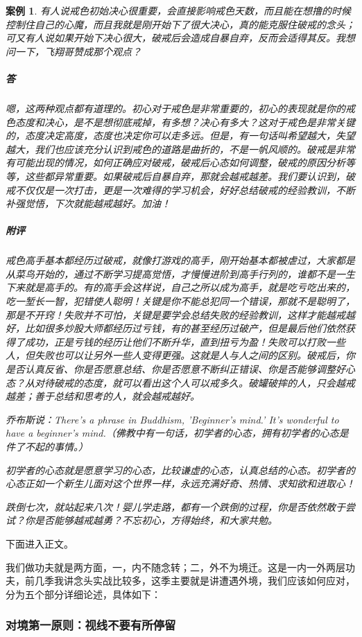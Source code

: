 \documentclass{ctexart}
\newtheorem{case}{案例}
\begin{document}
\begin{case}
    有人说戒色初始决心很重要，会直接影响戒色天数，而且能在想撸的时候控制住自己的心魔，而且我就是刚开始下了很大决心，真的能克服住破戒的念头；可又有人说如果开始下决心很大，破戒后会造成自暴自弃，反而会适得其反。我想问一下，飞翔哥赞成那个观点？
    \subparagraph{答} 嗯，这两种观点都有道理的。初心对于戒色是非常重要的，初心的表现就是你的戒色态度和决心，是不是想彻底戒掉，有多想？决心有多大？这对于戒色是非常关键的，态度决定高度，态度也决定你可以走多远。但是，有一句话叫希望越大，失望越大，我们也应该充分认识到戒色的道路是曲折的，不是一帆风顺的。破戒是非常有可能出现的情况，如何正确应对破戒，破戒后心态如何调整，破戒的原因分析等等，这些都异常重要。如果破戒后自暴自弃，那就会越戒越差。我们要认识到，破戒不仅仅是一次打击，更是一次难得的学习机会，好好总结破戒的经验教训，不断补强觉悟，下次就能越戒越好。加油！
    \subparagraph{附评} 戒色高手基本都经历过破戒，就像打游戏的高手，刚开始基本都被虐过，大家都是从菜鸟开始的，通过不断学习提高觉悟，才慢慢进阶到高手行列的，谁都不是一生下来就是高手的。有的高手会这样说，自己之所以成为高手，就是吃亏吃出来的，吃一堑长一智，犯错使人聪明！关键是你不能总犯同一个错误，那就不是聪明了，那是不开窍！失败并不可怕，关键是要学会总结失败的经验教训，这样才能越戒越好，比如很多炒股大师都经历过亏钱，有的甚至经历过破产，但是最后他们依然获得了成功，正是亏钱的经历让他们不断升华，直到扭亏为盈！失败可以打败一些人，但失败也可以让另外一些人变得更强。这就是人与人之间的区别。破戒后，你是否认真反省、你是否愿意总结、你是否愿意不断纠正错误、你是否能够调整好心态？从对待破戒的态度，就可以看出这个人可以戒多久。破罐破摔的人，只会越戒越差；善于总结和思考的人，就会越戒越好。

    乔布斯说：There's a phrase in Buddhism, 'Beginner's mind.' It's wonderful to have a beginner's mind.（佛教中有一句话，初学者的心态，拥有初学者的心态是件了不起的事情。）

    初学者的心态就是愿意学习的心态，比较谦虚的心态，认真总结的心态。初学者的心态正如一个新生儿面对这个世界一样，永远充满好奇、热情、求知欲和进取心！

    跌倒七次，就站起来八次！婴儿学走路，都有一个跌倒的过程，你是否依然敢于尝试？你是否能够越戒越勇？不忘初心，方得始终，和大家共勉。
\end{case}

下面进入正文。

我们做功夫就是两方面，一，内不随念转；二，外不为境迁。这是一内一外两层功夫，前几季我讲念头实战比较多，这季主要就是讲遭遇外境，我们应该如何应对，分为五个部分详细论述，具体如下：

\subsubsection{对境第一原则：视线不要有所停留}
\end{document}
